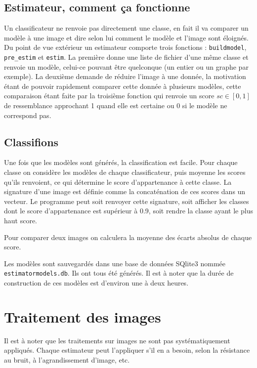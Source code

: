 \documentclass{article}
\theoremstyle{definition}
\begin{document}
  	   \subsection{Estimateur, comment ça fonctionne}
	Un classificateur ne renvoie pas directement une classe, en fait il va comparer un modèle à une image et dire selon lui comment le modèle et l'image sont éloignés. Du point de vue extérieur un estimateur comporte trois fonctions : \verb-buildmodel-, \verb-pre_estim- et \verb-estim-. La première donne une liste de fichier d'une même classe et renvoie un modèle, celui-ce pouvant être quelconque (un entier ou un graphe par exemple). La deuxième demande de réduire l'image à une donnée, la motivation étant de pouvoir rapidement comparer cette donnée à plusieurs modèles, cette comparaison étant faite par la troisième fonction qui renvoie un score $sc \in [0,1]$ de ressemblance approchant 1 quand elle est certaine ou 0 si le modèle ne correspond pas.

  	   \subsection{Classifions}
  	   Une fois que les modèles sont générés, la classification est facile. Pour chaque classe on considère les modèles de chaque classificateur, puis moyenne les scores qu'ils renvoient, ce qui détermine le score d'appartenance à cette classe. La signature d'une image est définie comme la concaténation de ces scores dans un vecteur. Le programme peut soit renvoyer cette signature, soit afficher les classes dont le score d'appartenance est supérieur à 0.9, soit rendre la classe ayant le plus haut score.
  	   
  	   Pour comparer deux images on calculera la moyenne des écarts absolus de chaque score.
  	   
  	    Les modèles sont sauvegardés dans une base de données SQlite3 nommée \verb-estimatormodels.db-. Ils ont tous été générés. Il est à noter que la durée de construction de ces modèles est d'environ une à deux heures.
  
  \section{Traitement des images}
  
  	Il est à noter que les traitements sur images ne sont pas systématiquement appliqués. Chaque estimateur peut l'appliquer s'il en a besoin, selon la résistance au bruit, à l'agrandissement d'image, etc.
  
\end{document}
